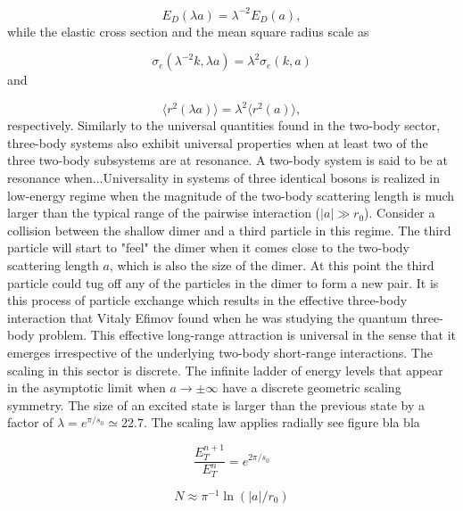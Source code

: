 \documentclass{article}
\providecommand{\abs}[1]{\lvert#1\rvert} \providecommand{\norm}[1]{\lVert#1\rVert}
\numberwithin{equation}{section}
\begin{document}
\begin{equation}
E_D(\lambda a) = \lambda^{-2}E_D(a),
\end{equation}    
while the elastic cross section and the mean square radius scale as 

\begin{equation}
\sigma_e(\lambda^{-2}k,\lambda a) = \lambda^2 \sigma_e(k,a)
\end{equation}
and

\begin{equation}
\langle r^2(\lambda a)\rangle = \lambda^2 \langle r^2(a)\rangle ,
\end{equation}
respectively. Similarly to the universal quantities found in the two-body sector, three-body systems also exhibit universal properties when at least two of the three two-body subsystems are at resonance. A two-body system is said to be at resonance when...Universality in systems of three identical bosons is realized in low-energy regime when the magnitude of the two-body scattering length is much larger than the typical range of the pairwise interaction ($\abs{a} \gg r_0$). Consider a collision between the shallow dimer and a third particle in this regime. The third particle will start to "feel" the dimer when it comes close to the two-body scattering length $a$, which is also the size of the dimer. At this point the third particle could tug off any of the particles in the dimer to form a new pair. It is this process of particle exchange which results in the effective three-body interaction that Vitaly Efimov found when he was studying the quantum three-body problem. This effective long-range attraction is universal in the sense that it emerges irrespective of the underlying two-body short-range interactions. The scaling in this sector is discrete. The infinite ladder of energy levels that appear in the asymptotic limit when $a \to \pm \infty$ have a discrete geometric scaling symmetry. The size of an excited state is larger than the previous state by a factor of $\lambda = e^{\pi/s_0} \simeq 22.7$. The scaling law applies radially see figure bla bla %

\begin{equation}
\frac{E_T^{n+1}}{E_T^{n}} = e^{2\pi/s_0}
\end{equation}

\begin{equation}
N \approx \pi^{-1} \ln(\abs{a}/r_0)
\end{equation}
\end{document}
